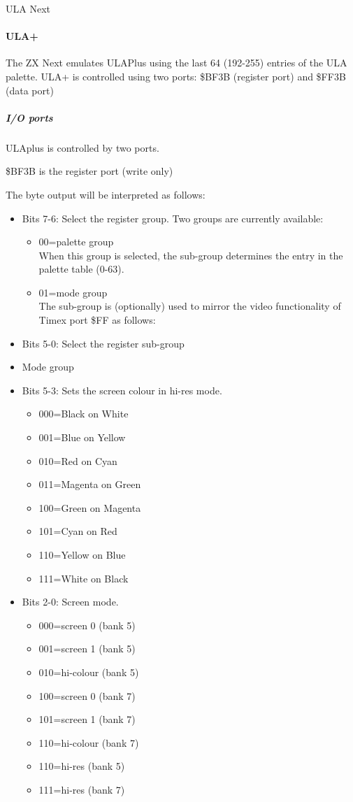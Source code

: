 \begin{table}[h]\centering
  \caption{ULA Next}
\end{table}

\paragraph{ULA+}
The ZX Next emulates ULAPlus using the last 64 (192-255) entries of
the ULA palette. ULA+ is controlled using two ports: \$BF3B (register
port) and \$FF3B (data port)

\subparagraph{I/O ports}
ULAplus is controlled by two ports.

\$BF3B is the register port (write only)

The byte output will be interpreted as follows:
\begin{itemize}
\item Bits 7-6: Select the register group. Two groups are currently available:
  \begin{itemize}
  \item 00=palette group\\
    When this group is selected, the sub-group determines the entry in the
    palette table (0-63).
  \item 01=mode group\\
    The sub-group is (optionally) used to mirror the video functionality
    of Timex port \$FF as follows:
  \end{itemize}
\item Bits 5-0: Select the register sub-group
\item[] Mode group
\item Bits 5-3: Sets the screen colour in hi-res mode.
  \begin{itemize}
  \item 000=Black on White
  \item 001=Blue on Yellow
  \item 010=Red on Cyan
  \item 011=Magenta on Green
  \item 100=Green on Magenta
  \item 101=Cyan on Red
  \item 110=Yellow on Blue
  \item 111=White on Black
  \end{itemize}
\item Bits 2-0: Screen mode.
  \begin{itemize}
  \item 000=screen 0 (bank 5)
  \item 001=screen 1 (bank 5)
  \item 010=hi-colour (bank 5)
  \item 100=screen 0 (bank 7)
  \item 101=screen 1 (bank 7)
  \item 110=hi-colour (bank 7)
  \item 110=hi-res (bank 5)
  \item 111=hi-res (bank 7)
  \end{itemize}
\end{itemize}

